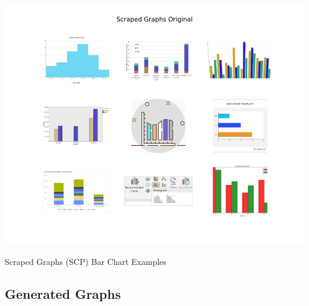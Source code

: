 \documentclass[12pt]{article}
\begin{document}
            \begin{table}[h]
            
                \begin{center}

                    \includegraphics[scale=0.6]{scraped_overview_original.png}
                    \caption{Scraped Graphs (SCP) Bar Chart Examples \cite{sunedition2021}}
                    \label{scraped-overview}
        
                \end{center}
                
            \end{table}

            

        \subsection{Generated Graphs}
            
\end{document}
